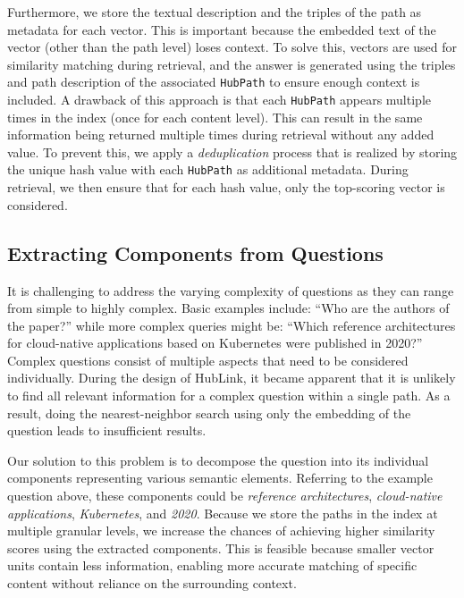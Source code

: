 Furthermore, we store the textual description and the triples of the path as metadata for each vector. This is important because the embedded text of the vector (other than the path level) loses context. To solve this, vectors are used for similarity matching during retrieval, and the answer is generated using the triples and path description of the associated \texttt{HubPath} to ensure enough context is included. A drawback of this approach is that each \texttt{HubPath} appears multiple times in the index (once for each content level). This can result in the same information being returned multiple times during retrieval without any added value. To prevent this, we apply a \emph{deduplication} process that is realized by storing the unique hash value with each \texttt{HubPath} as additional metadata. During retrieval, we then ensure that for each hash value, only the top-scoring vector is considered.

\subsection{Extracting Components from Questions}

It is challenging to address the varying complexity of questions as they can range from simple to highly complex. Basic examples include: \enquote{Who are the authors of the paper?} while more complex queries might be: \enquote{Which reference architectures for cloud-native applications based on Kubernetes were published in 2020?} Complex questions consist of multiple aspects that need to be considered individually. During the design of HubLink, it became apparent that it is unlikely to find all relevant information for a complex question within a single path. As a result, doing the nearest-neighbor search using only the embedding of the question leads to insufficient results.

Our solution to this problem is to decompose the question into its individual components representing various semantic elements. Referring to the example question above, these components could be \emph{reference architectures}, \emph{cloud-native applications}, \emph{Kubernetes}, and \emph{2020}. Because we store the paths in the index at multiple granular levels, we increase the chances of achieving higher similarity scores using the extracted components. This is feasible because smaller vector units contain less information, enabling more accurate matching of specific content without reliance on the surrounding context.

